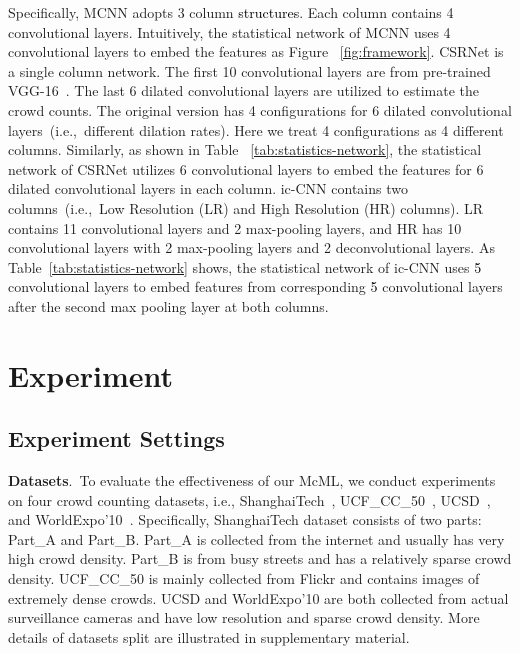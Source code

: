 \documentclass[sigconf]{acmart}
\newcommand{\ljx}[1]{\textcolor{black}{#1}}
\newcommand{\czq}[1]{\textcolor{black}{#1}}
\newcommand{\ljxa}[1]{\textcolor{black}{#1}}
\begin{document}
Specifically, MCNN adopts 3 column \ljxa{structures}.  
Each column contains 4 convolutional layers.
Intuitively,  the statistical network of MCNN uses 4 convolutional layers to embed the features as Figure ~\ref{fig:framework}.
CSRNet is a single column network.
The first 10 convolutional layers are from pre-trained VGG-16~\cite{vgg-14}.
The last 6 dilated convolutional layers are utilized to estimate the crowd count\ljx{s}.
The original version has 4 configurations for 6 dilated convolutional layers~(i.e.,~different dilation rates).
Here we treat 4 configurations as 4 different columns.
Similarly, as shown in Table ~\ref{tab:statistics-network}, the statistical network of CSRNet utilizes 6 convolutional layers to embed the features for 6 dilated convolutional layers in each column.
ic-CNN contains two columns~(i.e.,~Low Resolution (LR) and High Resolution (HR) columns). 
LR contains 11 convolutional layers and 2 max-pooling layers, and HR has 10 convolutional layers with 2 max-pooling layers and 2 deconvolutional layers. 
As Table~\ref{tab:statistics-network} shows, the statistical network of ic-CNN uses \czq{5} convolutional layers to embed features from corresponding \czq{5} convolutional layers after the second max pooling layer at both columns.









\vspace{-2mm}
\section{Experiment}
\label{sec:experiment}
\subsection{Experiment Settings}
\label{sec:experiment-settings}
\noindent\textbf{Datasets}.~To evaluate the effectiveness of our McML, we conduct experiments on four crowd counting datasets, i.e.,
\noindent ShanghaiTech~\cite{MCNN-16},
UCF\_CC\_50~\cite{r-mrf-count-multi-source-13},
UCSD~\cite{r-count-privacy-preserving-08}, and
WorldExpo'10~\cite{deep-crowd-scene-15}.
Specifically, ShanghaiTech dataset consists of two parts: Part\_A and Part\_B. 
Part\_A is collected from the internet and usually has very high crowd density. 
Part\_B is from busy streets and has a relatively sparse crowd density.
UCF\_CC\_50 is mainly collected from Flickr and contains images of extremely dense crowds.
UCSD and WorldExpo'10 are both collected from actual surveillance cameras and have low resolution and sparse crowd density.
More details of datasets split are illustrated in supplementary material.
\end{document}
